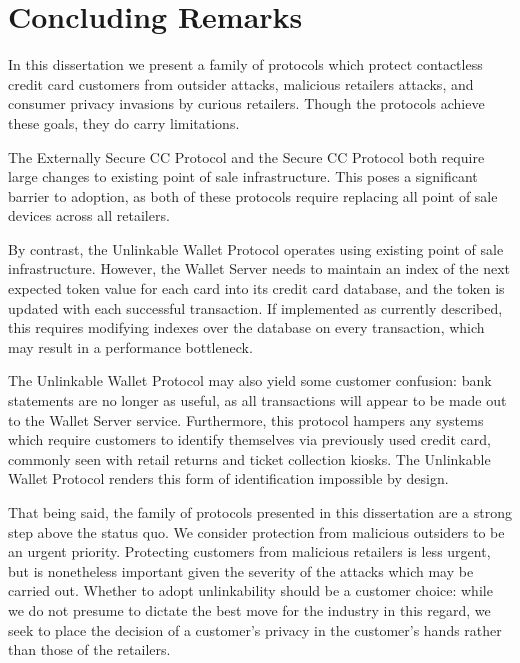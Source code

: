\section{Concluding Remarks}

In this dissertation we present a family of protocols which protect contactless credit card customers from
    outsider attacks, malicious retailers attacks, and consumer privacy invasions by curious retailers.
Though the protocols achieve these goals, they do carry limitations.

The Externally Secure CC Protocol and the Secure CC Protocol both require large changes to existing point of sale infrastructure.
This poses a significant barrier to adoption, as both of these protocols require replacing all point of sale devices across all retailers.

By contrast, the Unlinkable Wallet Protocol operates using existing point of sale infrastructure.
However, the Wallet Server needs to maintain an index of the next expected token value for each card into its credit card database,
    and the token is updated with each successful transaction.
If implemented as currently described, this requires modifying indexes over the database on every transaction, which may result in a performance bottleneck.

The Unlinkable Wallet Protocol may also yield some customer confusion:
    bank statements are no longer as useful, as all transactions will appear to be made out to the Wallet Server service.
Furthermore, this protocol hampers any systems which require customers to identify themselves via previously used credit card,
    commonly seen with retail returns and ticket collection kiosks.
The Unlinkable Wallet Protocol renders this form of identification impossible by design.

That being said, the family of protocols presented in this dissertation are a strong step above the status quo.
We consider protection from malicious outsiders to be an urgent priority.
Protecting customers from malicious retailers is less urgent, but is nonetheless important given the severity of the attacks which may be carried out.
Whether to adopt unlinkability should be a customer choice:
    while we do not presume to dictate the best move for the industry in this regard,
    we seek to place the decision of a customer's privacy in the customer's hands rather than those of the retailers.
